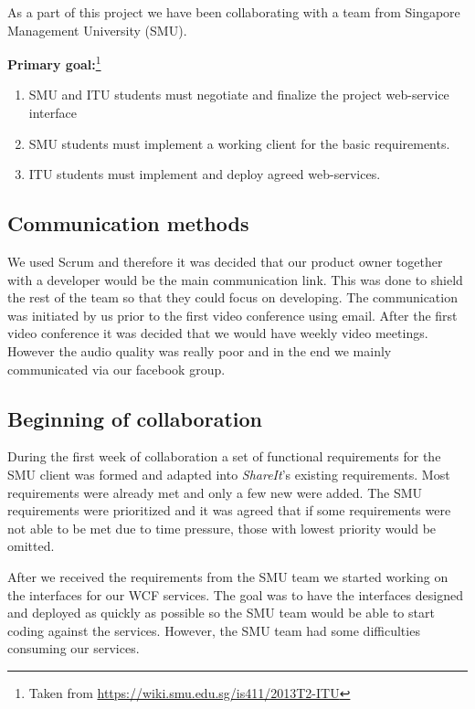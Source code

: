 \documentclass[../report.tex]{subfiles}
\begin{document}
\graphicspath{{img/}{../img/}}

As a part of this project we have been collaborating with a team from Singapore Management University (SMU).

\textbf{Primary goal:}\footnote{Taken from \url{https://wiki.smu.edu.sg/is411/2013T2-ITU}}
\begin{enumerate}[label=\bfseries G\arabic*:]
\item SMU and ITU students must negotiate and finalize the project web-service interface
\item SMU students must implement a working client for the basic requirements.
\item ITU students must implement and deploy agreed web-services.
\end{enumerate}

\subsection{Communication methods}
We used Scrum and therefore it was decided that our product owner together with a developer would be the main communication link.
This was done to shield the rest of the team so that they could focus on developing.
The communication was initiated by us prior to the first video conference using email.
After the first video conference it was decided that we would have weekly video meetings.
However the audio quality was really poor and in the end we mainly communicated via our facebook group.
\subsection{Beginning of collaboration}
During the first week of collaboration a set of functional requirements for the SMU client was formed and adapted into \textit{ShareIt}'s existing requirements. 
Most requirements were already met and only a few new were added. 
The SMU requirements were prioritized and it was agreed that if  some requirements were not able to be met due to time pressure, those with lowest priority would be omitted.

After we received the requirements from the SMU team we started working on the interfaces for our WCF services. 
The goal was to have the interfaces designed and deployed as quickly as possible so the SMU team would be able to start coding against the services.
However, the SMU team had some difficulties consuming our services.
\end{document}
